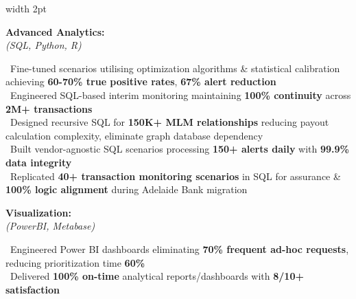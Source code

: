 \documentclass[11pt,a4paper]{article}
\newcommand{\linesection}[1]{%
  \vspace{10pt}%
  \noindent{\color{headerblue}\large\bfseries #1}\hspace{0.5em}{\color{sectionline}\leavevmode\leaders\hrule height 1.5pt\hfill\kern0pt}%
  \par\vspace{8pt}%
}
\begin{document}
\vspace{6pt}

\linesection{KEY SKILLS}

\noindent\begin{minipage}{\textwidth}
\hspace{2pt}\vrule width 2pt\hspace{15pt}%
\begin{minipage}[t]{\textwidth-19pt}

\noindent\begin{minipage}[t]{0.28\textwidth}
\textbf{\color{headerblue}Advanced Analytics:}\\[0pt]
\textit{(SQL, Python, R)}
\end{minipage}%
\hfill%
\begin{minipage}[t]{0.68\textwidth}
\textbullet\ Fine-tuned scenarios utilising optimization algorithms \& statistical calibration achieving \textbf{60-70\% true positive rates}, \textbf{67\% alert reduction}\\
\textbullet\ Engineered SQL-based interim monitoring maintaining \textbf{100\% continuity} across \textbf{2M+ transactions}\\
\textbullet\ Designed recursive SQL for \textbf{150K+ MLM relationships} reducing payout calculation complexity, eliminate graph database dependency\\
\textbullet\ Built vendor-agnostic SQL scenarios processing \textbf{150+ alerts daily} with \textbf{99.9\% data integrity}\\
\textbullet\ Replicated \textbf{40+ transaction monitoring scenarios} in SQL for assurance \& \textbf{100\% logic alignment} during Adelaide Bank migration
\end{minipage}

\vspace{6pt}

\noindent\begin{minipage}[t]{0.28\textwidth}
\textbf{\color{headerblue}Visualization:}\\[0pt]
\textit{(PowerBI, Metabase)}
\end{minipage}%
\hfill%
\begin{minipage}[t]{0.68\textwidth}
\textbullet\ Engineered Power BI dashboards eliminating \textbf{70\% frequent ad-hoc requests}, reducing prioritization time \textbf{60\%}\\
\textbullet\ Delivered \textbf{100\% on-time} analytical reports/dashboards with \textbf{8/10+ satisfaction}
\end{minipage}


\end{minipage}
\end{minipage}
\end{document}
